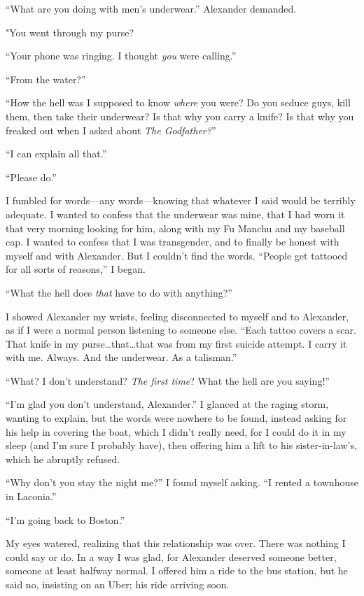``What are you doing with men's underwear.'' Alexander demanded.

"You went through my purse?

``Your phone was ringing. I thought \emph{you} were calling.''

``From the water?''

``How the hell was I supposed to know \emph{where} you were? Do you
seduce guys, kill them, then take their underwear? Is that why you carry
a knife? Is that why you freaked out when I asked about \emph{The
Godfather?}''

``I can explain all that.''

``Please do.''

I fumbled for words---any words---knowing that whatever I said would be
terribly adequate. I wanted to confess that the underwear was mine, that
I had worn it that very morning looking for him, along with my Fu Manchu
and my baseball cap. I wanted to confess that I was transgender, and to
finally be honest with myself and with Alexander. But I couldn't find
the words. ``People get tattooed for all sorts of reasons,'' I began.

``What the hell does \emph{that} have to do with anything?''

I showed Alexander my wrists, feeling disconnected to myself and to
Alexander, as if I were a normal person listening to someone else.
``Each tattoo covers a scar. That knife in my
purse\ldots that\ldots that was from my first suicide attempt. I carry
it with me. Always. And the underwear. As a talisman.''

``What? I don't understand? \emph{The first time}? What the hell are you
saying!''

``I'm glad you don't understand, Alexander.'' I glanced at the raging
storm, wanting to explain, but the words were nowhere to be found,
instead asking for his help in covering the boat, which I didn't really
need, for I could do it in my sleep (and I'm sure I probably have), then
offering him a lift to his sister-in-law's, which he abruptly refused.

``Why don't you stay the night me?'' I found myself asking. ``I rented a
townhouse in Laconia.''

``I'm going back to Boston.''

My eyes watered, realizing that this relationship was over. There was
nothing I could say or do. In a way I was glad, for Alexander deserved
someone better, someone at least halfway normal. I offered him a ride to
the bus station, but he said no, insisting on an Uber; his ride arriving
soon.

